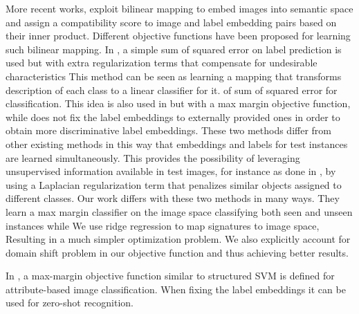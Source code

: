 \documentclass[10pt,twocolumn,letterpaper]{article}
\begin{document}
More recent works, exploit bilinear mapping to embed images into semantic space and assign a compatibility score to image and label embedding
 pairs based on their inner product. Different objective functions have been proposed for learning such bilinear mapping.
 In \cite{emb15}, a simple sum of squared error on label prediction is used but with extra regularization terms that compensate for undesirable characteristics
This method can be seen as learning a mapping that transforms description of each class to a  linear classifier for it.
 of sum of squared error for classification.
 This idea is also used in \cite{li15max, semi15} but with  a max margin objective function,
while \cite{semi15}  does not fix the label embeddings to externally provided ones in order to obtain more discriminative label embeddings. These two methods
differ from other existing methods in this way that embeddings and labels for test instances are learned simultaneously. This provides the possibility of
leveraging unsupervised information available in test images, for instance as done in \cite{semi15}, by using a Laplacian regularization term that penalizes
 similar objects assigned to different classes.
Our work differs with these two methods in many ways. They
learn a max margin classifier on the image space classifying both seen and unseen instances while We use ridge regression to map signatures to image space, Resulting
in a much simpler optimization problem. We also explicitly account for domain shift problem in our objective function and thus achieving better results.

In \cite{Akata2015pami}, a max-margin objective function similar to structured SVM is defined for attribute-based image classification. When fixing the label embeddings
it can be used for zero-shot recognition.

\end{document}
